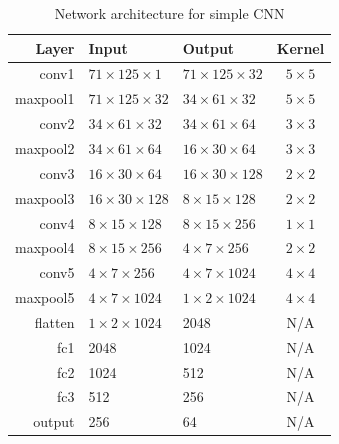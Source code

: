 \begin{table}[!ht]
	\centering
	\small
	\caption{Network architecture for simple CNN}
	\begin{tabular}{rllc}
		\toprule
		Layer    & Input                     & Output                    & Kernel       \\ \midrule
		conv1    & $71 \times 125 \times 1$  & $71 \times 125 \times 32$ & $5 \times 5$ \\
		maxpool1 & $71 \times 125 \times 32$ & $34 \times 61 \times 32$  & $5 \times 5$ \\
		conv2    & $34 \times 61 \times 32$  & $34 \times 61 \times 64$  & $3 \times 3$ \\
		maxpool2 & $34 \times 61 \times 64$  & $16 \times 30 \times 64$  & $3 \times 3$ \\
		conv3    & $16 \times 30 \times 64$  & $16 \times 30 \times 128$ & $2 \times 2$ \\
		maxpool3 & $16 \times 30 \times 128$ & $8 \times 15 \times 128$  & $2 \times 2$ \\
		conv4    & $8 \times 15 \times 128$  & $8 \times 15 \times 256$  & $1 \times 1$ \\
		maxpool4 & $8 \times 15 \times 256$  & $4 \times 7 \times 256$   & $2 \times 2$ \\
		conv5    & $4 \times 7 \times 256$   & $4 \times 7 \times 1024$  & $4 \times 4$ \\
		maxpool5 & $4 \times 7 \times 1024$  & $1 \times 2 \times 1024$  & $4 \times 4$ \\
		flatten  & $1 \times 2 \times 1024$  & 2048                      & N/A          \\
		fc1      & 2048                      & 1024                      & N/A          \\
		fc2      & 1024                      & 512                       & N/A          \\
		fc3      & 512                       & 256                       & N/A          \\
		output   & 256                       & 64                        & N/A          \\ \bottomrule
	\end{tabular}
	\label{tab:dcnn}
\end{table}


